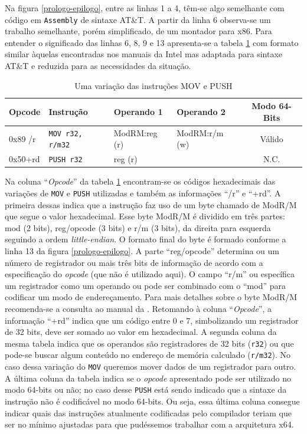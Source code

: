 Na figura \ref{prologo-epilogo}, entre as linhas 1 a 4, têm-se algo
semelhante com código em \texttt{Assembly} de sintaxe
AT\&T. A partir da linha 6 observa-se um trabalho semelhante, porém
simplificado, de um montador para x86. Para entender o significado das
linhas 6, 8, 9 e 13 apresenta-se a tabela \ref{mov-push-1} com formato
similar àquelas encontradas nos  manuais da Intel
\cite{intel_aam}\cite{intel_naz} mas
adaptada para sintaxe AT\&T e reduzida para as necessidades da situação.

\begin{table}
  \caption{Uma variação das instruções MOV e PUSH\label{mov-push-1}}
  \centering
  \begin{tabular}{l l l l c}
    \toprule
    Opcode  & Instrução     & Operando 1    & Operando 2    &  Modo 64-Bits \\
    \midrule
    0x89 /r & \verb!MOV r32, r/m32!& ModRM:reg (r) & ModRM:r/m (w) &  Válido       \\
    0x50+rd & \verb!PUSH r32!      & reg (r)       &               &  N.C.         \\
    \bottomrule
  \end{tabular}
\end{table}

Na coluna ``\textit{Opcode}'' da tabela \ref{mov-push-1} encontram-se
os códigos hexadecimais das variações de \verb!MOV! e \verb!PUSH!
utilizadas e também as informações ``/r'' e ``+rd''. A primeira dessas
indica que a instrução faz uso de um byte chamado de ModR/M que segue
o valor hexadecimal. Esse byte ModR/M é dividido em três partes: mod (2 bits),
reg/opcode (3 bits) e r/m (3 bits), da direita para esquerda seguindo
a ordem \textit{little-endian}. O formato final do byte é formado conforme
a linha 13 da figura \ref{prologo-epilogo}.
A parte ``reg/opcode'' determina ou um
número de registrador ou mais três bits de informação de acordo com
a especificação do \textit{opcode} (que não é utilizado aqui). O campo
``r/m'' ou específica um registrador como um operando ou pode ser
combinado com o ``mod'' para codificar um modo de endereçamento. Para
mais detalhes sobre o byte ModR/M recomenda-se a consulta ao manual da
. Retomando à coluna
``\textit{Opcode}'', a informação ``+rd'' indica que um código entre 0
e 7, simbolizando um registrador de 32 bits, deve ser somado ao valor
em hexadecimal. A segunda coluna da mesma tabela indica que os operandos são
registradores de 32 bits (\verb!r32!) ou que pode-se buscar algum
conteúdo no endereço de memória calculado (\verb!r/m32!). No
caso dessa variação do \verb!MOV! queremos mover dados de um
registrador para outro. A última coluna da tabela indica se o
\textit{opcode} apresentado pode ser utilizado no modo 64-bits ou não;
no caso desse \verb!PUSH! está sendo indicado que a sintaxe da instrução
não é codificável no modo 64-bits. Ou seja, essa última coluna
consegue indicar quais das instruções atualmente codificadas pelo
compilador teriam que ser no mínimo ajustadas para que pudéssemos
trabalhar com a arquitetura x64.

